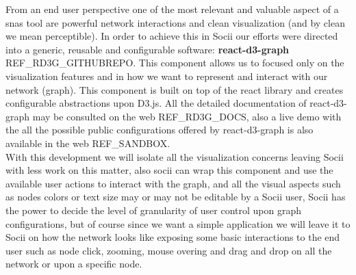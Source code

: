 From an end user perspective one of the most relevant and valuable aspect of a \glspl{sna} tool are powerful network interactions and clean visualization (and by clean we mean perceptible). In order to achieve this in Socii our efforts were directed into a generic, reusable and configurable software: \textbf{react-d3-graph} REF\_RD3G\_GITHUBREPO. This component allows us to focused only on the visualization features and in how we want to represent and interact with our network (graph). This component is built on top of the react library and creates configurable abstractions upon D3.js. All the detailed documentation of react-d3-graph
may be consulted on the web REF\_RD3G\_DOCS, also a live demo with the all the possible public configurations offered by react-d3-graph is also available in the web REF\_SANDBOX.\\
With this development we will isolate all the visualization concerns leaving Socii with less work on this matter, also socii can wrap this component and use the available user actions to interact with the graph, and all the visual aspects such as nodes colors or text size may or may not be editable by a Socii user, Socii has the power to decide the level of granularity of user control upon graph configurations, but of course since we want a simple application we will leave it to Socii on how the network looks like exposing some basic interactions to the end user such as node click, zooming, mouse overing and drag and drop on all the network or upon a specific node.

